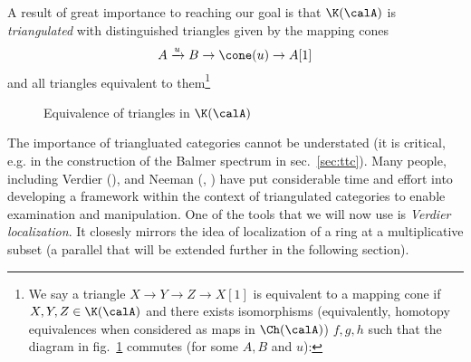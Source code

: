 \documentclass[12pt]{article}
\begin{document}
A result of great importance to reaching our goal is that $\K(\calA)$ is \textit{triangulated} with distinguished triangles given by the mapping cones 
\[A\xrightarrow{u} B\to \cone(u)\to A[1]\]
and all triangles equivalent to them\footnote{We say a triangle $X\to Y\to Z\to X[1]$ is equivalent to a mapping cone if $X,Y,Z\in\K(\calA)$ and there exists isomorphisms (equivalently, homotopy equivalences when considered as maps in $\Ch(\calA)$)
$f,g,h$ such that the diagram in fig.~\ref{fig:tri-equiv} commutes (for some $A,B$ and $u$):
}
\begin{figure}
	\centering
	\caption{Equivalence of triangles in $\K(\calA)$}
	\label{fig:tri-equiv}
\end{figure}

The importance of triangluated categories cannot be understated (it is critical, e.g. in the construction of the Balmer spectrum in sec.~\ref{sec:ttc}). Many people, including 
Verdier (\cite{verdier-thesis}), and Neeman (\cite{neeman-duality}, \cite{neeman-book}) have put considerable time and effort into developing a 
framework within the context of triangulated categories to enable examination and manipulation. One of the tools 
that we will now use is \textit{Verdier localization}. It closesly mirrors the idea of localization of a ring at a multiplicative 
subset (a parallel that will be extended further in the following section).
\end{document}
